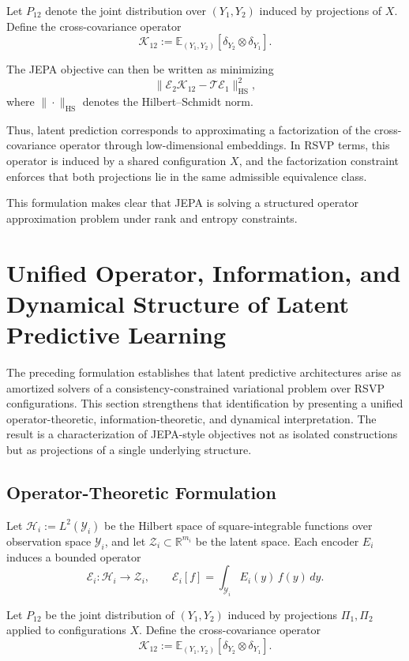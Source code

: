 \documentclass[12pt, oneside]{article}
\begin{document}
Let $P_{12}$ denote the joint distribution over $(Y_1, Y_2)$ induced by projections of $X$. Define the cross-covariance operator
\[
\mathcal{K}_{12} := \mathbb{E}_{(Y_1,Y_2)} \left[ \delta_{Y_2} \otimes \delta_{Y_1} \right].
\]

The JEPA objective can then be written as minimizing
\[
\| \mathcal{E}_2 \mathcal{K}_{12} - \mathcal{T} \mathcal{E}_1 \|_{\mathrm{HS}}^2,
\]
where $\|\cdot\|_{\mathrm{HS}}$ denotes the Hilbert--Schmidt norm.

Thus, latent prediction corresponds to approximating a factorization of the cross-covariance operator through low-dimensional embeddings. In RSVP terms, this operator is induced by a shared configuration $X$, and the factorization constraint enforces that both projections lie in the same admissible equivalence class.

This formulation makes clear that JEPA is solving a structured operator approximation problem under rank and entropy constraints.

\section{Unified Operator, Information, and Dynamical Structure of Latent Predictive Learning}
\label{sec:unified}

The preceding formulation establishes that latent predictive architectures arise as amortized solvers of a consistency-constrained variational problem over RSVP configurations. This section strengthens that identification by presenting a unified operator-theoretic, information-theoretic, and dynamical interpretation. The result is a characterization of JEPA-style objectives not as isolated constructions but as projections of a single underlying structure.

\subsection{Operator-Theoretic Formulation}

Let $\mathcal{H}_i := L^2(\mathcal{Y}_i)$ be the Hilbert space of square-integrable functions over observation space $\mathcal{Y}_i$, and let $\mathcal{Z}_i \subset \mathbb{R}^{m_i}$ be the latent space. Each encoder $E_i$ induces a bounded operator
\[
\mathcal{E}_i : \mathcal{H}_i \to \mathcal{Z}_i,
\qquad
\mathcal{E}_i[f] = \int_{\mathcal{Y}_i} E_i(y)\, f(y)\, dy.
\]

Let $P_{12}$ be the joint distribution of $(Y_1, Y_2)$ induced by projections $\Pi_1, \Pi_2$ applied to configurations $X$. Define the cross-covariance operator
\[
\mathcal{K}_{12} := \mathbb{E}_{(Y_1,Y_2)} \left[ \delta_{Y_2} \otimes \delta_{Y_1} \right].
\]
\end{document}
